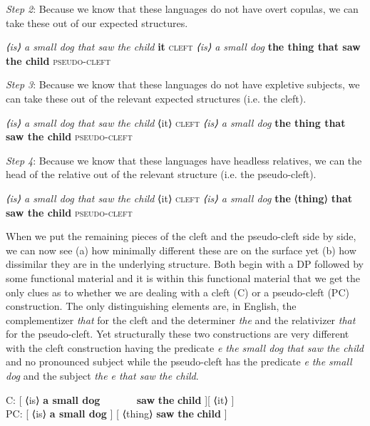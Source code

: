 \documentclass[output=paper]{langsci/langscibook}
\begin{document}
\textit{Step 2}:  Because we know that these languages do not have overt
copulas, we can take these out of our expected structures.

\ea
    \ea \emph{⟨is⟩ a small dog that saw the child } \textbf{it} \hfill \textsc{cleft}
    \ex \emph{⟨is⟩ a small dog} \textbf{the thing that saw the child} \hfill \textsc{pseudo-cleft}
    \z
\z

\textit{Step 3}:  Because we know that these languages do not have expletive
subjects, we can take these out of the relevant expected structures (i.e. the
cleft).

\ea
    \ea \emph{⟨is⟩ a small dog that saw the child } ⟨it⟩ \hfill \textsc{cleft}
    \ex \emph{⟨is⟩ a small dog} \textbf{the thing that saw the child} \hfill \textsc{pseudo-cleft}
    \z
\z

\textit{Step 4}:  Because we know that these languages have headless relatives,
we can the head of the relative out of the relevant structure (i.e. the
pseudo-cleft).

\ea\label{travis:14}
    \ea \emph{⟨is⟩ a small dog that saw the child } ⟨it⟩ \hfill \textsc{cleft}
    \ex \emph{⟨is⟩ a small dog} \textbf{the} ⟨\textbf{thing}⟩ \textbf{that saw the child}  \hfill \textsc{pseudo-cleft}
    \z
\z

When we put the remaining pieces of the cleft and the pseudo-cleft side by
side, we can now see (a) how minimally different these are on the surface yet
(b) how dissimilar they are in the underlying structure.  Both begin with a DP
followed by some functional material and it is within this functional material
that we get the only clues as to whether we are dealing with a cleft (C) or a
pseudo-cleft (PC) construction.  The only distinguishing elements are, in
English, the complementizer \emph{that} for the cleft  and the determiner
\emph{the} and the relativizer \emph{that} for the pseudo-cleft.  Yet
structurally these two constructions are very different with the cleft
construction having the predicate \emph{e the small dog that saw the child} and
no pronounced subject while the pseudo-cleft has the predicate \emph{e the
small dog} and the subject \emph{the e that saw the child}.


\ea\label{travis:15}
    \gll C: [ ⟨is⟩ \textbf{a small dog} ~ ~  ~ ~ \textbf{saw} \textbf{the} \textbf{child} ][ ⟨it⟩ ] \label{ex:littewords}\\
    PC:  [ ⟨is⟩ \textbf{a small dog} ] [  ⟨thing⟩  \textbf{saw} \textbf{the} \textbf{child} ] \\
\z
\end{document}
